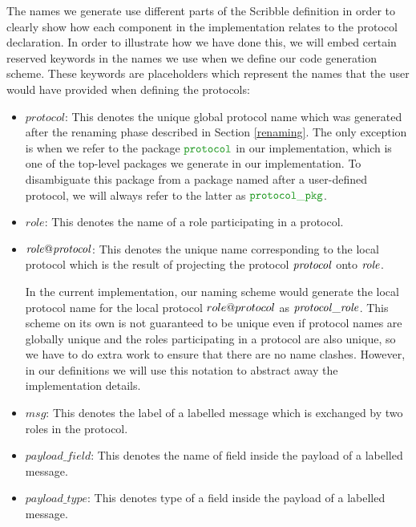 \documentclass[12pt,twoside]{report}
\begin{document}


The names we generate use different parts of the Scribble definition in order to clearly show how each component in the implementation relates to the protocol declaration. In order to illustrate how we have done this, we will embed certain reserved keywords in the names we use when we define our code generation scheme. These keywords are placeholders which represent the names that the user would have provided when defining the protocols:

\begin{itemize}
    \item $\mathit{protocol}$: This denotes the unique global protocol name which was generated after the renaming phase described in Section \ref{renaming}. The only exception is when we refer to the package $\pkgname{protocol}$ in our implementation, which is one of the top-level packages we generate in our implementation. To disambiguate this package from a package named after a user-defined protocol, we will always refer to the latter as $\pkgname{protocol\_pkg}$.

    \item $\mathit{role}$: This denotes the name of a role participating in a protocol.

    \item $\mathit{\localprotocol{role}{protocol}}$: This denotes the unique name corresponding to the local protocol which is the result of projecting the protocol $\protocolname{protocol}$ onto $\rolename{role}$.
    
    In the current implementation, our naming scheme would generate the local protocol name for the local protocol $\localprotocol{role}{protocol}$ as $\localprotocolname{role}{protocol}$. This scheme on its own is not guaranteed to be unique even if protocol names are globally unique and the roles participating in a protocol are also unique, so we have to do extra work to ensure that there are no name clashes. However, in our definitions we will use this notation to abstract away the implementation details.

    \item $\mathit{msg}$: This denotes the label of a labelled message which is exchanged by two roles in the protocol.
    
    \item $\mathit{payload\_field}$: This denotes the name of field inside the payload of a labelled message.
    
    \item $\mathit{payload\_type}$: This denotes type of a field inside the payload of a labelled message.
\end{itemize}
\end{document}
